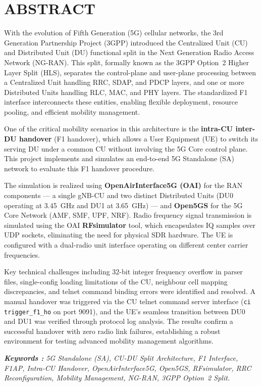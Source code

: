 \chapter*{ABSTRACT}%
\begin{justify}

With the evolution of Fifth Generation (5G) cellular networks, the 3rd Generation Partnership Project (3GPP) introduced the Centralized Unit (CU) and Distributed Unit (DU) functional split in the Next Generation Radio Access Network (NG-RAN). This split, formally known as the 3GPP Option~2 Higher Layer Split (HLS), separates the control-plane and user-plane processing between a Centralized Unit handling RRC, SDAP, and PDCP layers, and one or more Distributed Units handling RLC, MAC, and PHY layers. The standardized F1 interface interconnects these entities, enabling flexible deployment, resource pooling, and efficient mobility management.

One of the critical mobility scenarios in this architecture is the \textbf{intra-CU inter-DU handover} (F1 handover), which allows a User Equipment (UE) to switch its serving DU under a common CU without involving the 5G Core control plane. This project implements and simulates an end-to-end 5G Standalone (SA) network to evaluate this F1 handover procedure.

The simulation is realized using \textbf{OpenAirInterface5G (OAI)} for the RAN components --- a single gNB-CU and two distinct Distributed Units (DU0 operating at 3.45~GHz and DU1 at 3.65~GHz) --- and \textbf{Open5GS} for the 5G Core Network (AMF, SMF, UPF, NRF). Radio frequency signal transmission is simulated using the OAI \textbf{RFsimulator} tool, which encapsulates IQ samples over UDP sockets, eliminating the need for physical SDR hardware. The UE is configured with a dual-radio unit interface operating on different center carrier frequencies.

Key technical challenges including 32-bit integer frequency overflow in parser files, single-config loading limitations of the CU, neighbour cell mapping discrepancies, and telnet command binding errors were identified and resolved. A manual handover was triggered via the CU telnet command server interface (\texttt{ci trigger\_f1\_ho} on port 9091), and the UE's seamless transition between DU0 and DU1 was verified through protocol log analysis. The results confirm a successful handover with zero radio link failures, establishing a robust environment for testing advanced mobility management algorithms.

\end{justify}

\begin{flushleft}
\vspace{0.5cm}
\textsl {\textbf {Keywords :} 5G Standalone (SA), CU-DU Split Architecture, F1 Interface, F1AP, Intra-CU Handover, OpenAirInterface5G, Open5GS, RFsimulator, RRC Reconfiguration, Mobility Management, NG-RAN, 3GPP Option~2 Split.}
\end{flushleft}
